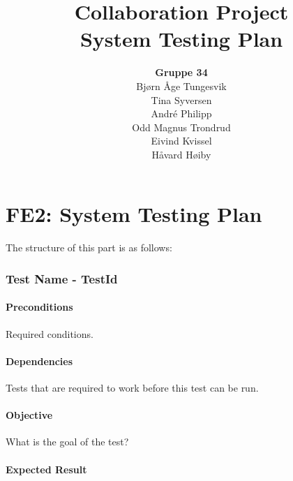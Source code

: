 \documentclass{article}
\begin{document}
\begin{titlepage}
\title{Collaboration Project\\
System Testing Plan}
\author{\textbf{Gruppe 34}\\
Bj\o rn \AA ge Tungesvik\\
Tina Syversen\\
Andr\'e Philipp\\
Odd Magnus Trondrud
\\Eivind Kvissel\\
H\aa vard H\o iby}
\maketitle
\end{titlepage}

\part{FE2: System Testing Plan}

The structure of this part is as follows:

\section{Test Name - TestId}

\subsection{Preconditions}

Required conditions.

\subsection{Dependencies}

Tests that are required to work before this test can be run.

\subsection{Objective}

What is the goal of the test?

\subsection{Expected Result}
\end{document}
